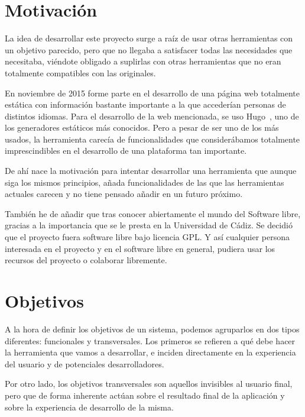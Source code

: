 \section{Motivación}

La idea de desarrollar este proyecto surge a raíz de usar otras herramientas con un objetivo
parecido, pero que no llegaba a satisfacer todas las necesidades que necesitaba, viéndote obligado
a suplirlas con otras herramientas que no eran totalmente compatibles con las originales.

En noviembre de 2015 forme parte en el desarrollo de una página web totalmente estática con información
bastante importante a la que accederían personas de distintos idiomas. Para el desarrollo de la web mencionada,
se uso Hugo~\cite{hugo}, uno de los generadores estáticos más conocidos. Pero a pesar de ser uno de los más usados,
la herramienta carecía de funcionalidades que considerábamos totalmente imprescindibles en el desarrollo
de una plataforma tan importante.

De ahí nace la motivación para intentar desarrollar una herramienta que aunque siga los mismos principios,
añada funcionalidades de las que las herramientas actuales carecen y no tiene pensado añadir en un futuro
próximo.

También he de añadir que tras conocer abiertamente el mundo del Software libre, gracias a la importancia
que se le presta en la Universidad de Cádiz. Se decidió que el proyecto fuera software libre bajo
licencia GPL. Y así cualquier persona interesada en el proyecto y en el software libre
en general, pudiera usar los recursos del proyecto o colaborar libremente.

\section{Objetivos}

A la hora de definir los objetivos de un sistema, podemos agruparlos en dos tipos
diferentes: funcionales y transversales. Los primeros se refieren a qué debe hacer
la herramienta que vamos a desarrollar, e inciden directamente en la experiencia del
usuario y de potenciales desarrolladores.

Por otro lado, los objetivos transversales son aquellos invisibles al usuario final,
pero que de forma inherente actúan sobre el resultado final de la aplicación y
sobre la experiencia de desarrollo de la misma.

